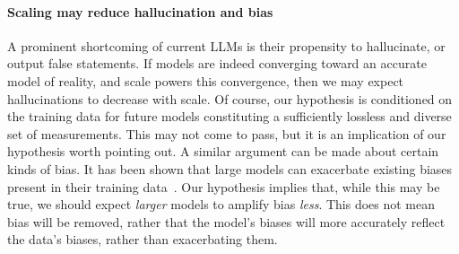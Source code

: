 \documentclass{article}
\newcommand{\jh}[1]{{\;\color{red}JH: #1}}
\theoremstyle{plain}
\theoremstyle{definition}
\theoremstyle{remark}
\begin{document}


\paragraph{Scaling may reduce hallucination and bias} 
A prominent shortcoming of current LLMs is their propensity to hallucinate, or output false statements. If models are indeed converging toward an accurate model of reality, and scale powers this convergence, then we may expect hallucinations to decrease with scale. Of course, our hypothesis is conditioned on the training data for future models constituting a sufficiently lossless and diverse set of measurements. This may not come to pass, but it is an implication of our hypothesis worth pointing out. A similar argument can be made about certain kinds of bias. It has been shown that large models can exacerbate existing biases present in their training data~\citep{hall2022systematic}. Our hypothesis implies that, while this may be true, we should expect \textit{larger} models to amplify bias \textit{less}. This does not mean bias will be removed, rather that the model's biases will more accurately reflect the data's biases, rather than exacerbating them.

\end{document}

